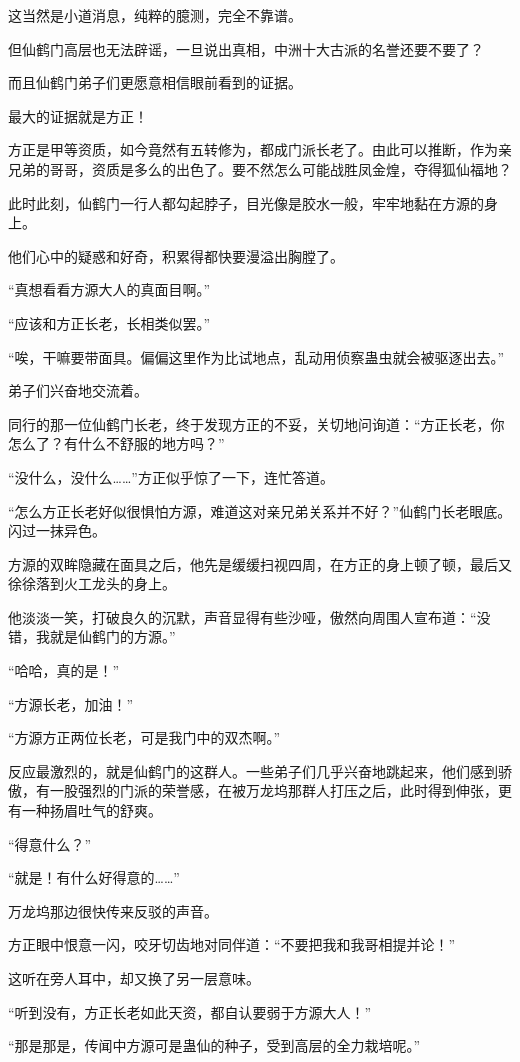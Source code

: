 \begin{this_body}
这当然是小道消息，纯粹的臆测，完全不靠谱。

但仙鹤门高层也无法辟谣，一旦说出真相，中洲十大古派的名誉还要不要了？

而且仙鹤门弟子们更愿意相信眼前看到的证据。

最大的证据就是方正！

方正是甲等资质，如今竟然有五转修为，都成门派长老了。由此可以推断，作为亲兄弟的哥哥，资质是多么的出色了。要不然怎么可能战胜凤金煌，夺得狐仙福地？

此时此刻，仙鹤门一行人都勾起脖子，目光像是胶水一般，牢牢地黏在方源的身上。

他们心中的疑惑和好奇，积累得都快要漫溢出胸膛了。

“真想看看方源大人的真面目啊。”

“应该和方正长老，长相类似罢。”

“唉，干嘛要带面具。偏偏这里作为比试地点，乱动用侦察蛊虫就会被驱逐出去。”

弟子们兴奋地交流着。

同行的那一位仙鹤门长老，终于发现方正的不妥，关切地问询道：“方正长老，你怎么了？有什么不舒服的地方吗？”

“没什么，没什么……”方正似乎惊了一下，连忙答道。

“怎么方正长老好似很惧怕方源，难道这对亲兄弟关系并不好？”仙鹤门长老眼底。闪过一抹异色。

方源的双眸隐藏在面具之后，他先是缓缓扫视四周，在方正的身上顿了顿，最后又徐徐落到火工龙头的身上。

他淡淡一笑，打破良久的沉默，声音显得有些沙哑，傲然向周围人宣布道：“没错，我就是仙鹤门的方源。”

“哈哈，真的是！”

“方源长老，加油！”

“方源方正两位长老，可是我门中的双杰啊。”

反应最激烈的，就是仙鹤门的这群人。一些弟子们几乎兴奋地跳起来，他们感到骄傲，有一股强烈的门派的荣誉感，在被万龙坞那群人打压之后，此时得到伸张，更有一种扬眉吐气的舒爽。

“得意什么？”

“就是！有什么好得意的……”

万龙坞那边很快传来反驳的声音。

方正眼中恨意一闪，咬牙切齿地对同伴道：“不要把我和我哥相提并论！”

这听在旁人耳中，却又换了另一层意味。

“听到没有，方正长老如此天资，都自认要弱于方源大人！”

“那是那是，传闻中方源可是蛊仙的种子，受到高层的全力栽培呢。”


\end{this_body}
